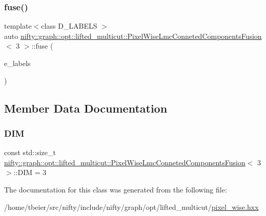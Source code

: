 \subsubsection{\texorpdfstring{fuse()}{fuse()}\hspace{0.1cm}{\footnotesize\ttfamily [2/2]}}
{\footnotesize\ttfamily template$<$class D\+\_\+\+L\+A\+B\+E\+LS $>$ \\
auto \hyperlink{classnifty_1_1graph_1_1opt_1_1lifted__multicut_1_1PixelWiseLmcConnetedComponentsFusion}{nifty\+::graph\+::opt\+::lifted\+\_\+multicut\+::\+Pixel\+Wise\+Lmc\+Conneted\+Components\+Fusion}$<$ 3 $>$\+::fuse (\begin{DoxyParamCaption}\item[{const xt\+::xexpression$<$ D\+\_\+\+L\+A\+B\+E\+LS $>$ \&}]{e\+\_\+labels }\end{DoxyParamCaption})\hspace{0.3cm}{\ttfamily [inline]}}



\subsection{Member Data Documentation}
\mbox{\label{classnifty_1_1graph_1_1opt_1_1lifted__multicut_1_1PixelWiseLmcConnetedComponentsFusion_3_013_01_4_a722656c7be957d378dc3b6fa47b387ad}} 
\subsubsection{\texorpdfstring{D\+IM}{DIM}}
{\footnotesize\ttfamily const std\+::size\+\_\+t \hyperlink{classnifty_1_1graph_1_1opt_1_1lifted__multicut_1_1PixelWiseLmcConnetedComponentsFusion}{nifty\+::graph\+::opt\+::lifted\+\_\+multicut\+::\+Pixel\+Wise\+Lmc\+Conneted\+Components\+Fusion}$<$ 3 $>$\+::D\+IM = 3\hspace{0.3cm}{\ttfamily [static]}}



The documentation for this class was generated from the following file\+:\begin{DoxyCompactItemize}
\item 
/home/tbeier/src/nifty/include/nifty/graph/opt/lifted\+\_\+multicut/\hyperlink{pixel__wise_8hxx}{pixel\+\_\+wise.\+hxx}\end{DoxyCompactItemize}
